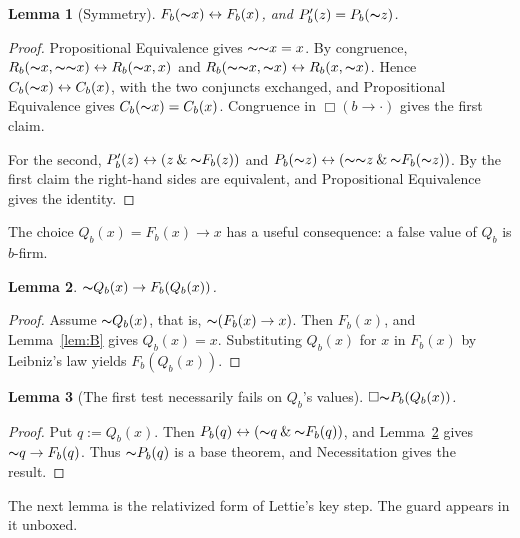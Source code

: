 \documentclass[12pt,leqno]{article}
\newcommand{\AND}{\ensuremath{\mathbin{\&}}}
\newcommand{\IFF}{\ensuremath{\leftrightarrow}}
\newcommand{\IC}{\ensuremath{\rightarrow}}
\newcommand{\NOT}{\ensuremath{\text{$\thicksim$}}}
\theoremstyle{plain}
\newtheorem{lemma}{Lemma}
\begin{document}
\begin{lemma}[Symmetry]\label{lem:C}
\(F_b(\NOT x)\IFF F_b(x)\), and \(P'_b(z)=P_b(\NOT z)\).
\end{lemma}
\begin{proof}
Propositional Equivalence gives \(\NOT\NOT x=x\). By congruence,
\(R_b(\NOT x,\NOT\NOT x)\IFF R_b(\NOT x,x)\) and
\(R_b(\NOT\NOT x,\NOT x)\IFF R_b(x,\NOT x)\). Hence
\(C_b(\NOT x)\IFF C_b(x)\), with the two conjuncts exchanged, and
Propositional Equivalence gives \(C_b(\NOT x)=C_b(x)\). Congruence in
\(\Box(b\IC\cdot)\) gives the first claim.

For the second, \(P'_b(z)\IFF(z\AND\NOT F_b(z))\) and
\(P_b(\NOT z)\IFF(\NOT\NOT z\AND\NOT F_b(\NOT z))\). By the first claim
the right-hand sides are equivalent, and Propositional Equivalence gives
the identity.
\end{proof}

The choice \(Q_b(x)=F_b(x)\IC x\) has a useful consequence: a false
value of \(Q_b\) is \(b\)-firm.

\begin{lemma}\label{lem:D}
\(\NOT Q_b(x)\IC F_b(Q_b(x))\).
\end{lemma}
\begin{proof}
Assume \(\NOT Q_b(x)\), that is, \(\NOT(F_b(x)\IC x)\). Then \(F_b(x)\),
and Lemma~\ref{lem:B} gives \(Q_b(x)=x\). Substituting \(Q_b(x)\) for
\(x\) in \(F_b(x)\) by Leibniz's law yields \(F_b(Q_b(x))\).
\end{proof}

\begin{lemma}[The first test necessarily fails on \(Q_b\)'s values]\label{lem:E}
\(\Box\NOT P_b(Q_b(x))\).
\end{lemma}
\begin{proof}
Put \(q:=Q_b(x)\). Then \(P_b(q)\IFF(\NOT q\AND\NOT F_b(q))\), and
Lemma~\ref{lem:D} gives \(\NOT q\IC F_b(q)\). Thus \(\NOT P_b(q)\) is a
base theorem, and Necessitation gives the result.
\end{proof}

The next lemma is the relativized form of Lettie's key step. The guard
appears in it unboxed.
\end{document}
